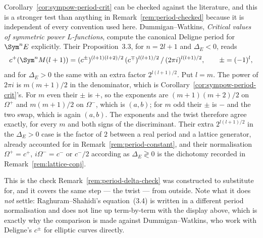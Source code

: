 \begin{remark}
  \label{rem:period-literature}
  Corollary~\ref{cor:sympow-period-crit} can be checked against the literature, and this is a
  stronger test than anything in Remark~\ref{rem:period-checked} because it is independent of
  every convention used here. Dummigan--Watkins, \emph{Critical values of symmetric power
  $L$-functions}, compute the canonical Deligne period for $\Sym^{n}E$ explicitly. Their
  Proposition~3.3, for $n = 2l+1$ and $\Delta_{E} < 0$, reads
  \[
    c^{+}(\Sym^{n}M(l+1)) = (c^{\pm})^{(l+1)(l+2)/2}\,(c^{\mp})^{l(l+1)/2}\,/\,(2\pi i)^{l(l+1)/2},
    \qquad \pm = (-1)^{l},
  \]
  and for $\Delta_{E} > 0$ the same with an extra factor $2^{l(l+1)/2}$. Put $l=m$. The power
  of $2\pi i$ is $m(m+1)/2$ in the denominator, which is
  Corollary~\ref{cor:sympow-period-crit}'s. For $m$ even their $\pm$ is $+$, so the exponents
  are $(m+1)(m+2)/2$ on $\Omega^{+}$ and $m(m+1)/2$ on $\Omega^{-}$, which is $(a,b)$; for $m$
  odd their $\pm$ is $-$ and the two swap, which is again $(a,b)$. The exponents and the twist
  therefore agree exactly, for every $m$ and both signs of the discriminant. Their extra
  $2^{l(l+1)/2}$ in the $\Delta_{E}>0$ case is the factor of $2$ between a real period and a
  lattice generator, already accounted for in Remark~\ref{rem:period-constant}, and their
  normalisation $\Omega^{+}=c^{+}$, $i\Omega^{-}=c^{-}$ or $c^{-}/2$ according as
  $\Delta_{E} \gtrless 0$ is the dichotomy recorded in Remark~\ref{rem:lattice-conj}.

  This is the check Remark~\ref{rem:period-delta-check} was constructed to substitute for, and
  it covers the same step --- the twist --- from outside. Note what it does \emph{not} settle:
  Raghuram--Shahidi's equation~(3.4) is written in a different period normalisation and does
  not line up term-by-term with the display above, which is exactly why the comparison is made
  against Dummigan--Watkins, who work with Deligne's $c^{\pm}$ for elliptic curves directly.
\end{remark}

